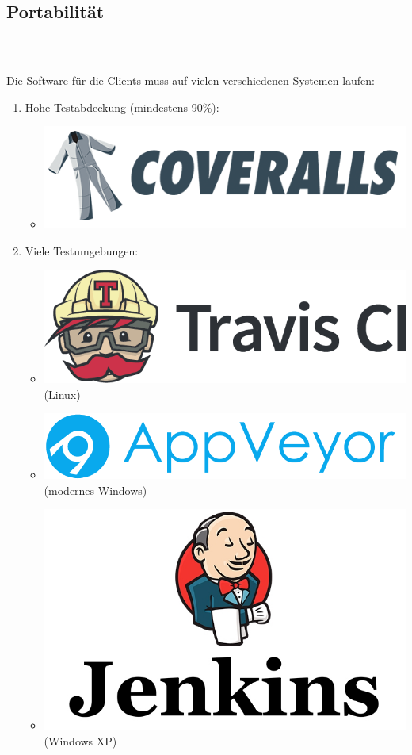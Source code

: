 \documentclass[accentcolor=tud1b,colorbacktitle,landscape,german,presentation]{tudbeamer}
\newcommand{\ftitle}{

	\frametitle{\insertsectionhead \\ {\small \insertsubsectionhead}}
}
\begin{document}
\subsection{Portabilität}
\begin{frame}
	\ftitle
	Die Software für die Clients muss auf vielen verschiedenen Systemen laufen:\\[5pt]
	\begin{enumerate}
		\item Hohe Testabdeckung (mindestens 90\%):
		\begin{itemize}
			\item \includegraphics[scale=0.1]{coveralls}
		\end{itemize}
		\item Viele Testumgebungen:
		\begin{itemize}
			\item \includegraphics[scale=0.1]{travisci} \hspace*{2cm} (Linux)
			\item \includegraphics[scale=0.1]{appveyor} \hspace*{1.55cm} (modernes Windows)
			\item \includegraphics[scale=0.1]{jenkins} \hspace*{2.5cm} (Windows XP)
		\end{itemize}
	\end{enumerate}


\end{frame}
\end{document}
